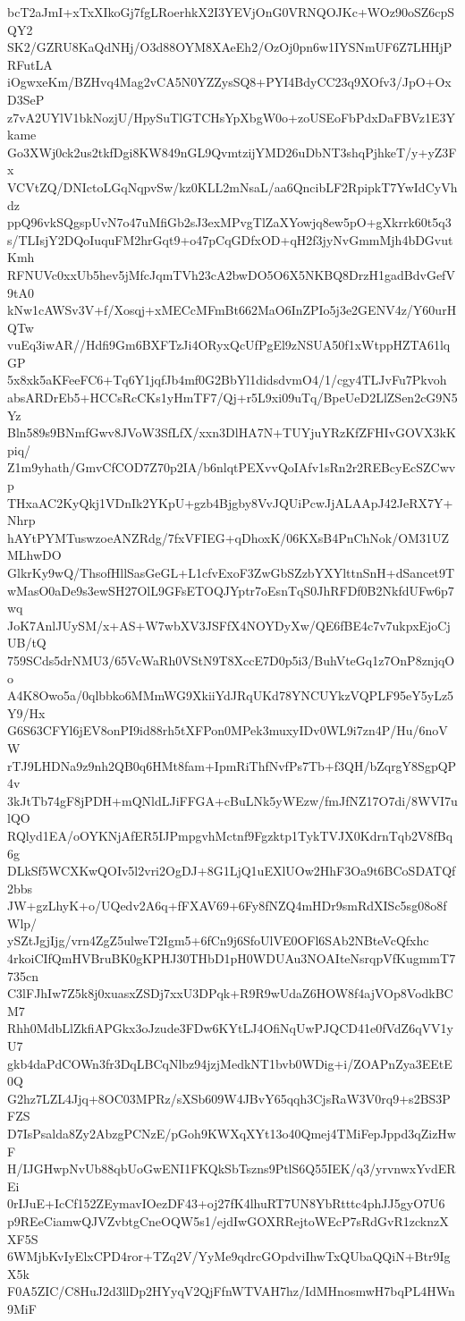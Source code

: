 bcT2aJmI+xTxXIkoGj7fgLRoerhkX2I3YEVjOnG0VRNQOJKc+WOz90oSZ6cpSQY2
SK2/GZRU8KaQdNHj/O3d88OYM8XAeEh2/OzOj0pn6w1IYSNmUF6Z7LHHjPRFutLA
iOgwxeKm/BZHvq4Mag2vCA5N0YZZysSQ8+PYI4BdyCC23q9XOfv3/JpO+OxD3SeP
z7vA2UYlV1bkNozjU/HpySuTlGTCHsYpXbgW0o+zoUSEoFbPdxDaFBVz1E3Ykame
Go3XWj0ck2us2tkfDgi8KW849nGL9QvmtzijYMD26uDbNT3shqPjhkeT/y+yZ3Fx
VCVtZQ/DNIctoLGqNqpvSw/kz0KLL2mNsaL/aa6QncibLF2RpipkT7YwIdCyVhdz
ppQ96vkSQgspUvN7o47uMfiGb2sJ3exMPvgTlZaXYowjq8ew5pO+gXkrrk60t5q3
s/TLIsjY2DQoIuquFM2hrGqt9+o47pCqGDfxOD+qH2f3jyNvGmmMjh4bDGvutKmh
RFNUVc0xxUb5hev5jMfcJqmTVh23cA2bwDO5O6X5NKBQ8DrzH1gadBdvGefV9tA0
kNw1cAWSv3V+f/Xosqj+xMECcMFmBt662MaO6InZPIo5j3e2GENV4z/Y60urHQTw
vuEq3iwAR//Hdfi9Gm6BXFTzJi4ORyxQcUfPgEl9zNSUA50f1xWtppHZTA61lqGP
5x8xk5aKFeeFC6+Tq6Y1jqfJb4mf0G2BbYl1didsdvmO4/1/cgy4TLJvFu7Pkvoh
absARDrEb5+HCCsRcCKs1yHmTF7/Qj+r5L9xi09uTq/BpeUeD2LlZSen2cG9N5Yz
Bln589s9BNmfGwv8JVoW3SfLfX/xxn3DlHA7N+TUYjuYRzKfZFHIvGOVX3kKpiq/
Z1m9yhath/GmvCfCOD7Z70p2IA/b6nlqtPEXvvQoIAfv1sRn2r2REBcyEcSZCwvp
THxaAC2KyQkj1VDnIk2YKpU+gzb4Bjgby8VvJQUiPcwJjALAApJ42JeRX7Y+Nhrp
hAYtPYMTuswzoeANZRdg/7fxVFIEG+qDhoxK/06KXsB4PnChNok/OM31UZMLhwDO
GlkrKy9wQ/ThsofHllSasGeGL+L1cfvExoF3ZwGbSZzbYXYlttnSnH+dSancet9T
wMasO0aDe9s3ewSH27OlL9GFsETOQJYptr7oEsnTqS0JhRFDf0B2NkfdUFw6p7wq
JoK7AnlJUySM/x+AS+W7wbXV3JSFfX4NOYDyXw/QE6fBE4c7v7ukpxEjoCjUB/tQ
759SCds5drNMU3/65VcWaRh0VStN9T8XccE7D0p5i3/BuhVteGq1z7OnP8znjqOo
A4K8Owo5a/0qlbbko6MMmWG9XkiiYdJRqUKd78YNCUYkzVQPLF95eY5yLz5Y9/Hx
G6S63CFYl6jEV8onPI9id88rh5tXFPon0MPek3muxyIDv0WL9i7zn4P/Hu/6noVW
rTJ9LHDNa9z9nh2QB0q6HMt8fam+IpmRiThfNvfPs7Tb+f3QH/bZqrgY8SgpQP4v
3kJtTb74gF8jPDH+mQNldLJiFFGA+cBuLNk5yWEzw/fmJfNZ17O7di/8WVI7ulQO
RQlyd1EA/oOYKNjAfER5IJPmpgvhMctnf9Fgzktp1TykTVJX0KdrnTqb2V8fBq6g
DLkSf5WCXKwQOIv5l2vri2OgDJ+8G1LjQ1uEXlUOw2HhF3Oa9t6BCoSDATQf2bbs
JW+gzLhyK+o/UQedv2A6q+fFXAV69+6Fy8fNZQ4mHDr9smRdXISc5sg08o8fWlp/
ySZtJgjIjg/vrn4ZgZ5ulweT2Igm5+6fCn9j6SfoUlVE0OFl6SAb2NBteVcQfxhc
4rkoiCIfQmHVBruBK0gKPHJ30THbD1pH0WDUAu3NOAIteNsrqpVfKugmmT7735cn
C3lFJhIw7Z5k8j0xuasxZSDj7xxU3DPqk+R9R9wUdaZ6HOW8f4ajVOp8VodkBCM7
Rhh0MdbLlZkfiAPGkx3oJzude3FDw6KYtLJ4OfiNqUwPJQCD41e0fVdZ6qVV1yU7
gkb4daPdCOWn3fr3DqLBCqNlbz94jzjMedkNT1bvb0WDig+i/ZOAPnZya3EEtE0Q
G2hz7LZL4Jjq+8OC03MPRz/sXSb609W4JBvY65qqh3CjsRaW3V0rq9+s2BS3PFZS
D7IsPsalda8Zy2AbzgPCNzE/pGoh9KWXqXYt13o40Qmej4TMiFepJppd3qZizHwF
H/IJGHwpNvUb88qbUoGwENI1FKQkSbTszns9PtlS6Q55IEK/q3/yrvnwxYvdEREi
0rIJuE+IcCf152ZEymavIOezDF43+oj27fK4lhuRT7UN8YbRtttc4phJJ5gyO7U6
p9REeCiamwQJVZvbtgCneOQW5s1/ejdIwGOXRRejtoWEcP7sRdGvR1zcknzXXF5S
6WMjbKvIyElxCPD4ror+TZq2V/YyMe9qdrcGOpdviIhwTxQUbaQQiN+Btr9IgX5k
F0A5ZIC/C8HuJ2d3llDp2HYyqV2QjFfnWTVAH7hz/IdMHnosmwH7bqPL4HWn9MiF
